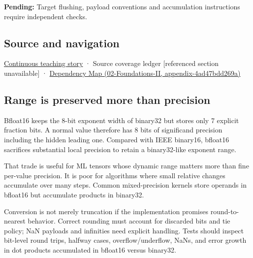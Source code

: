 \textbf{Pending:} Target flushing, payload conventions and accumulation instructions require independent checks.

\subsection{Source and navigation}\label{appendix-18b8dd966b5d-source-and-navigation}

\hyperref[01-foundations-i-ch001-choosing-what-information-to-keep]{Continuous teaching story} · {Source coverage ledger {[}referenced section unavailable{]}} · \href{../02-Foundations-II/main.pdf\#nameddest=appendix-4ad47bdd269a}{Dependency Map (02-Foundations-II, appendix-4ad47bdd269a)}

\subsection{Range is preserved more than precision}\label{appendix-18b8dd966b5d-range-is-preserved-more-than-precision}

Bfloat16 keeps the 8-bit exponent width of binary32 but stores only 7 explicit fraction bits. A normal value therefore has 8 bits of significand precision including the hidden leading one. Compared with IEEE binary16, bfloat16 sacrifices substantial local precision to retain a binary32-like exponent range.

That trade is useful for ML tensors whose dynamic range matters more than fine per-value precision. It is poor for algorithms where small relative changes accumulate over many steps. Common mixed-precision kernels store operands in bfloat16 but accumulate products in binary32.

Conversion is not merely truncation if the implementation promises round-to-nearest behavior. Correct rounding must account for discarded bits and tie policy; NaN payloads and infinities need explicit handling. Tests should inspect bit-level round trips, halfway cases, overflow/underflow, NaNs, and error growth in dot products accumulated in bfloat16 versus binary32.
